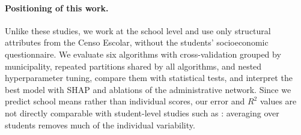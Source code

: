 \paragraph{Positioning of this work.}
Unlike these studies, we work at the school level and use only structural attributes from the
Censo Escolar, without the students' socioeconomic questionnaire. We evaluate six algorithms with
cross-validation grouped by municipality, repeated partitions shared by all algorithms, and nested
hyperparameter tuning, compare them with statistical tests, and interpret the best model with SHAP
and ablations of the administrative network. Since we predict school means rather than individual
scores, our error and $R^2$ values are not directly comparable with student-level studies such
as \cite{tertulino2026fatores}: averaging over students removes much of the individual
variability.
